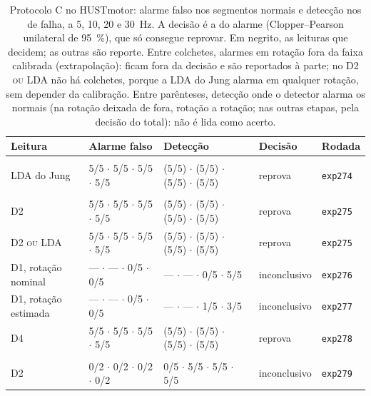 \begin{table}[H]
\centering
\caption{Protocolo C no HUSTmotor: alarme falso nos segmentos normais e detecção nos de falha, a 5, 10, 20 e 30~Hz. A decisão é a do alarme (Clopper--Pearson unilateral de 95~\%), que só consegue reprovar. Em negrito, as leituras que decidem; as outras são reporte. Entre colchetes, alarmes em rotação fora da faixa calibrada (extrapolação): ficam fora da decisão e são reportados à parte; no D2 \textsc{ou} LDA não há colchetes, porque a LDA do Jung alarma em qualquer rotação, sem depender da calibração. Entre parênteses, detecção onde o detector alarma os normais (na rotação deixada de fora, rotação a rotação; nas outras etapas, pela decisão do total): não é lida como acerto.}
\label{tab:protocoloC}
\footnotesize
\setlength{\tabcolsep}{4pt}
\begin{tabularx}{\textwidth}{>{\raggedright\arraybackslash}p{3.3cm} C{2.6cm} C{2.6cm} >{\raggedright\arraybackslash}X C{1.1cm}}
\toprule
\textbf{Leitura} & \textbf{Alarme falso} & \textbf{Detecção} & \textbf{Decisão} & \textbf{Rodada} \\
\midrule
{} \\
LDA do Jung & 5/5 $\cdot$ 5/5 $\cdot$ 5/5 $\cdot$ 5/5 & (5/5) $\cdot$ (5/5) $\cdot$ (5/5) $\cdot$ (5/5) & reprova & \texttt{exp274} \\
\midrule
{} \\
D2 & 5/5 $\cdot$ 5/5 $\cdot$ 5/5 $\cdot$ 5/5 & (5/5) $\cdot$ (5/5) $\cdot$ (5/5) $\cdot$ (5/5) & reprova & \texttt{exp275} \\
D2 \textsc{ou} LDA & 5/5 $\cdot$ 5/5 $\cdot$ 5/5 $\cdot$ 5/5 & (5/5) $\cdot$ (5/5) $\cdot$ (5/5) $\cdot$ (5/5) & reprova & \texttt{exp275} \\
D1, rotação nominal & --- $\cdot$ --- $\cdot$ 0/5 $\cdot$ 0/5 & --- $\cdot$ --- $\cdot$ 0/5 $\cdot$ 5/5 & inconclusivo & \texttt{exp276} \\
D1, rotação estimada & --- $\cdot$ --- $\cdot$ 0/5 $\cdot$ 0/5 & --- $\cdot$ --- $\cdot$ 1/5 $\cdot$ 3/5 & inconclusivo & \texttt{exp277} \\
D4 & 5/5 $\cdot$ 5/5 $\cdot$ 5/5 $\cdot$ 5/5 & (5/5) $\cdot$ (5/5) $\cdot$ (5/5) $\cdot$ (5/5) & reprova & \texttt{exp278} \\
\midrule
{} \\
D2 & 0/2 $\cdot$ 0/2 $\cdot$ 0/2 $\cdot$ 0/2 & 0/5 $\cdot$ 5/5 $\cdot$ 5/5 $\cdot$ 5/5 & inconclusivo & \texttt{exp279} \\

\end{tabularx}
\end{table}
